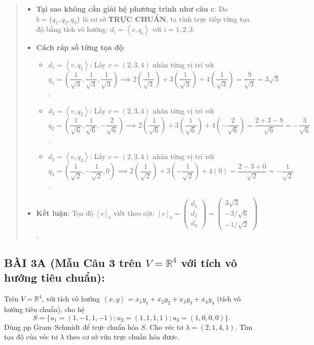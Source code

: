 \documentclass[12pt,a4paper]{article}
\newcommand{\R}{\mathbb{R}}
\newcommand{\ip}[2]{\left\langle #1,#2\right\rangle}
\begin{document}
\begin{quote}
\small
\noindent{}\par\vspace{3pt}
\begin{itemize}[noitemsep,topsep=2pt]
\item \textbf{Tại sao không cần giải hệ phương trình như câu c}: Do $b=\{q_1, q_2, q_3\}$ là cơ sở \textbf{TRỰC CHUẨN}, ta tính trực tiếp từng tọa độ bằng tích vô hướng: $d_i = \ip{v}{q_i}$ với $i=1, 2, 3$.
\item \textbf{Cách ráp số từng tọa độ}:
  \begin{itemize}[noitemsep]
  \item $d_1 = \ip{v}{q_1}$: Lấy $v=(2, 3, 4)$ nhân từng vị trí với $q_1 = \left(\dfrac{1}{\sqrt{3}}, \dfrac{1}{\sqrt{3}}, \dfrac{1}{\sqrt{3}}\right) \implies 2\left(\dfrac{1}{\sqrt{3}}\right) + 3\left(\dfrac{1}{\sqrt{3}}\right) + 4\left(\dfrac{1}{\sqrt{3}}\right) = \dfrac{9}{\sqrt{3}} = 3\sqrt{3}$.
  \item $d_2 = \ip{v}{q_2}$: Lấy $v=(2, 3, 4)$ nhân từng vị trí với $q_2 = \left(\dfrac{1}{\sqrt{6}}, \dfrac{1}{\sqrt{6}}, -\dfrac{2}{\sqrt{6}}\right) \implies 2\left(\dfrac{1}{\sqrt{6}}\right) + 3\left(\dfrac{1}{\sqrt{6}}\right) + 4\left(-\dfrac{2}{\sqrt{6}}\right) = \dfrac{2+3-8}{\sqrt{6}} = -\dfrac{3}{\sqrt{6}}$.
  \item $d_3 = \ip{v}{q_3}$: Lấy $v=(2, 3, 4)$ nhân từng vị trí với $q_3 = \left(\dfrac{1}{\sqrt{2}}, -\dfrac{1}{\sqrt{2}}, 0\right) \implies 2\left(\dfrac{1}{\sqrt{2}}\right) + 3\left(-\dfrac{1}{\sqrt{2}}\right) + 4(0) = \dfrac{2-3+0}{\sqrt{2}} = -\dfrac{1}{\sqrt{2}}$.
  \end{itemize}
\item \textbf{Kết luận}: Tọa độ $[v]_b$ viết theo cột: $[v]_b = \begin{pmatrix} d_1 \\ d_2 \\ d_3 \end{pmatrix} = \begin{pmatrix} 3\sqrt{3} \\ -3/\sqrt{6} \\ -1/\sqrt{2} \end{pmatrix}$.
\end{itemize}
\end{quote}


\vspace{0.3cm}

\subsection*{BÀI 3A (Mẫu Câu 3 trên $V = \R^4$ với tích vô hướng tiêu chuẩn):}
Trên $V=\R^4$, với tích vô hướng $\ip{x}{y} = x_1y_1+x_2y_2+x_3y_3+x_4y_4$ (tích vô hướng tiêu chuẩn), cho hệ
\[
S=\{u_1=(1, -1, 1, -1); u_2=(1, 1, 1, 1); u_3=(1, 0, 0, 0)\}.
\]
Dùng pp Gram--Schmidt để trực chuẩn hóa $S$. 
Cho véc tơ $\lambda=(2, 1, 4, 1)$. Tìm tọa độ của véc tơ $\lambda$ theo cơ sở vừa trực chuẩn hóa được.
\end{document}
